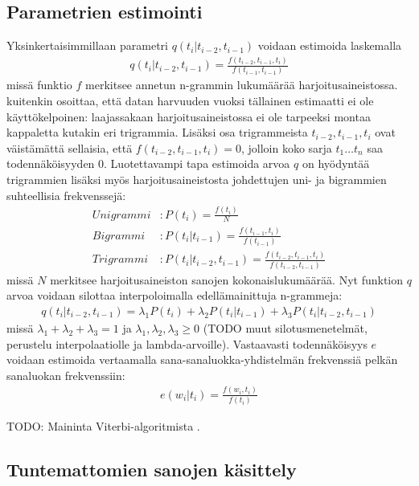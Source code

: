 \documentclass[utf8,bachelor,manualbib]{gradu3}
\begin{document}
\subsection{Parametrien estimointi}

Yksinkertaisimmillaan parametri $q(t_i|t_{i-2},t_{i-1})$ voidaan estimoida laskemalla
\begin{align}
q(t_i|t_{i-2},t_{i-1}) = \frac{f(t_{i-2},t_{i-1},t_i)}{f(t_{i-1},t_{i-1})}
\end{align}
missä funktio $f$ merkitsee annetun n-grammin lukumäärää harjoitusaineistossa. \citet{brants2000} kuitenkin osoittaa, että datan harvuuden vuoksi tällainen estimaatti ei ole käyttökelpoinen: laajassakaan harjoitusaineistossa ei ole tarpeeksi montaa kappaletta kutakin eri trigrammia. Lisäksi osa trigrammeista $t_{i-2},t_{i-1},t_i$ ovat väistämättä sellaisia, että $f(t_{i-2},t_{i-1},t_i) = 0$, jolloin koko sarja $t_1 \ldots t_n$ saa todennäköisyyden $0$. Luotettavampi tapa estimoida arvoa $q$ on hyödyntää trigrammien lisäksi myös harjoitusaineistosta johdettujen uni- ja bigrammien suhteellisia frekvenssejä:
\begin{align}
Unigrammi&: P(t_i) = \frac{f(t_i)}{N} \\
Bigrammi&: P(t_i | t_{i-1}) = \frac{f(t_{i-1}, t_i)}{f(t_{i-1})} \\
Trigrammi&: P(t_i | t_{i-2}, t_{i-1}) = \frac{f(t_{i-2},t_{i-1},t_i)}{f(t_{i-2},t_{i-1})}
\end{align}
missä $N$ merkitsee harjoitusaineiston sanojen kokonaislukumäärää. Nyt funktion $q$ arvoa voidaan silottaa interpoloimalla edellämainittuja n-grammeja:
\begin{align}
q(t_i | t_{i-2}, t_{i-1}) = \lambda_1 P(t_i) + \lambda_2 P(t_i | t_{i-1}) + \lambda_3 P(t_i | t_{i-2}, t_{i-1})
\end{align}
missä $\lambda_1+\lambda_2+\lambda_3 = 1$ ja $\lambda_1,\lambda_2,\lambda_3 \geq 0$ (TODO muut silotusmenetelmät, perustelu interpolaatiolle ja lambda-arvoille). Vastaavasti todennäköisyys $e$ voidaan estimoida vertaamalla sana-sanaluokka-yhdistelmän frekvenssiä pelkän sanaluokan frekvenssiin:
\begin{align}
e(w_i|t_i) = \frac{f(w_i, t_i)}{f(t_i)}
\label{hmm_param_e}
\end{align}

TODO: Maininta Viterbi-algoritmista \citep{viterbi1967}.

\subsection{Tuntemattomien sanojen käsittely}
\end{document}

